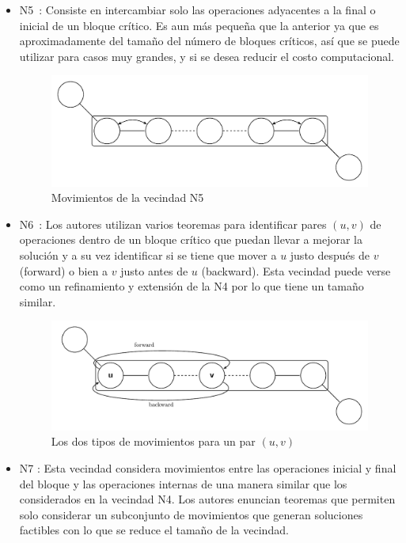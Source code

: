 \begin{itemize}
\item N5~\cite{EugeniuszNowicki2003}: Consiste en intercambiar solo las operaciones adyacentes a la final o inicial de un bloque crítico. 
%
Es aun más pequeña que la anterior ya que es aproximadamente del tamaño del número de bloques críticos, así que se puede utilizar para casos muy grandes, y si se desea
reducir el costo computacional.
\begin{figure}[H]
\centering
\includegraphics[scale=.7]{Imagenes/N5.pdf}
\caption{Movimientos de la vecindad N5}
\end{figure}

\item N6~\cite{Balas1998}: Los autores utilizan varios teoremas para identificar pares $(u,v)$ de operaciones dentro de un bloque crítico que puedan llevar a mejorar la 
solución y a su vez identificar si se tiene que mover a $u$ justo después de $v$(forward) o bien a $v$ justo antes de $u$ (backward). 
%
Esta vecindad puede verse como un refinamiento y extensión de la N4 por lo que tiene un tamaño similar.
\begin{figure}[H]
\centering
\includegraphics[scale=.7]{Imagenes/N6.pdf}
\caption{Los dos tipos de movimientos para un par $(u,v)$}
\end{figure}

\item N7 \cite{Zhang2007}: Esta vecindad considera movimientos entre las operaciones inicial y final del bloque y las operaciones internas de una manera similar que los considerados en la vecindad N4. Los autores enuncian teoremas que permiten solo considerar un subconjunto de movimientos que generan soluciones factibles con lo que se reduce el tamaño de la vecindad.


\end{itemize}
